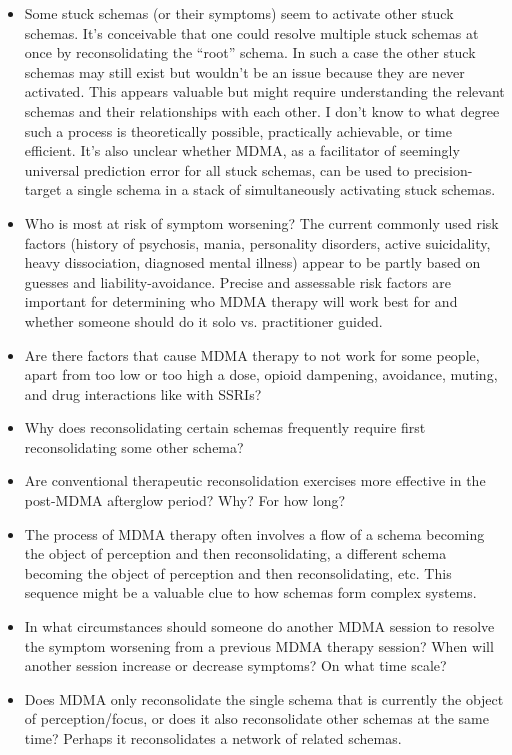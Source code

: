 \documentclass[11pt,oneside]{book}
\begin{document}
\begin{itemize}
    \item Some stuck schemas (or their symptoms) seem to activate other stuck schemas. It's conceivable that one could resolve multiple stuck schemas at once by reconsolidating the \enquote{root} schema. In such a case the other stuck schemas may still exist but wouldn't be an issue because they are never activated. This appears valuable but might require understanding the relevant schemas and their relationships with each other. I don't know to what degree such a process is theoretically possible, practically achievable, or time efficient. It's also unclear whether MDMA, as a facilitator of seemingly universal prediction error for all stuck schemas, can be used to precision-target a single schema in a stack of simultaneously activating stuck schemas.
    \item Who is most at risk of symptom worsening? The current commonly used risk factors (history of psychosis, mania, personality disorders, active suicidality, heavy dissociation, diagnosed mental illness) appear to be partly based on guesses and liability-avoidance. Precise and assessable risk factors are important for determining who MDMA therapy will work best for and whether someone should do it solo vs. practitioner guided.
    \item Are there factors that cause MDMA therapy to not work for some people, apart from too low or too high a dose, opioid dampening, avoidance, muting, and drug interactions like with SSRIs?
    \item Why does reconsolidating certain schemas frequently require first reconsolidating some other schema?
    \item Are conventional therapeutic reconsolidation exercises more effective in the post-MDMA afterglow period? Why? For how long?
    \item The process of MDMA therapy often involves a flow of a schema becoming the object of perception and then reconsolidating, a different schema becoming the object of perception and then reconsolidating, etc. This sequence might be a valuable clue to how schemas form complex systems.
    \item In what circumstances should someone do another MDMA session to resolve the symptom worsening from a previous MDMA therapy session? When will another session increase or decrease symptoms? On what time scale?
    \item Does MDMA only reconsolidate the single schema that is currently the object of perception/focus, or does it also reconsolidate other schemas at the same time? Perhaps it reconsolidates a network of related schemas.

\end{itemize}
\end{document}
